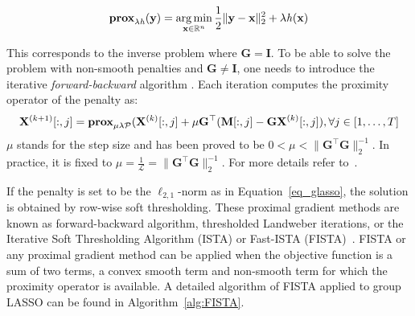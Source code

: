 \begin{equation}
\textbf{prox}_{\lambda\mathit{h}}(\mathbf{y})=\mathop{\mathrm{arg}\,\mathrm{min}}_{\mathbf{x}\in\mathbb{R}^n}\frac{1}{2}\|\mathbf{y}-\mathbf{x}\|_2^2+\lambda\mathit{h}(\mathbf{x})
\end{equation}

This corresponds to the inverse problem where $\mathbf{G}=\mathbf{I}$. To be able to solve the problem with non-smooth penalties and $\mathbf{G}\neq\mathbf{I}$, one needs to introduce the iterative \textit{forward-backward} algorithm \cite{moreau1965proximite}. Each iteration computes the proximity operator of the penalty as:
\begin{equation}
\mathbf{X}^{(k+1)}[:,j]=\textbf{prox}_{\mu\lambda\mathcal{P}}(\mathbf{X}^{(k)}[:,j]+\mu\mathbf{G}^\top(\mathbf{M}[:,j]-\mathbf{GX}^{(k)}[:,j]), \forall j\in [1,\dots ,T]
\end{equation}
$\mu$ stands for the step size and has been proved to be $0<\mu<\|\mathbf{G}^\top\mathbf{G}\|_2^{-1}$. In practice, it is fixed to $\mu=\frac{1}{\mathcal{L}}=
 \|\mathbf{G}^\top\mathbf{G}\|_2^{-1}$. For more details refer to~\cite{moreau1965proximite,combettes2005signal,daubechies2004iterative}.

If the penalty is set to be the $\ell_{2,1}$-norm as in Equation~\eqref{eq_glasso}, the solution is obtained by row-wise soft thresholding. These proximal gradient methods are known as forward-backward algorithm, thresholded Landweber iterations, or the Iterative Soft Thresholding Algorithm (ISTA) or Fast-ISTA (FISTA)~\cite{bach-etal:2012,parikh2014proximal}. FISTA or any proximal gradient method can be applied when the objective function is a sum of two terms, a convex smooth term and non-smooth term for which the proximity operator is available.
A detailed algorithm of FISTA applied to group LASSO can be found in Algorithm~\ref{alg:FISTA}. 

